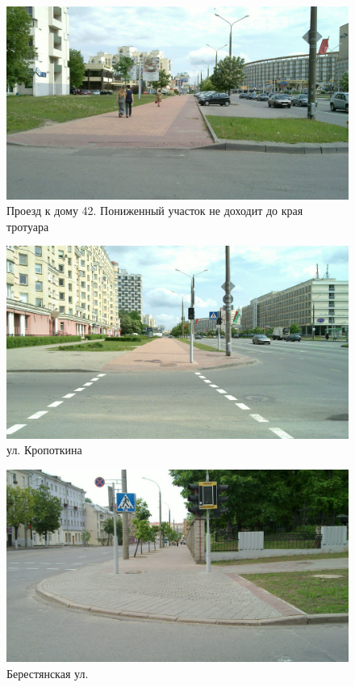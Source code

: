\documentclass[a4paper,14pt,twoside]{extarticle}
\begin{document}
\begin{figure}[h!]
    \centering
    \includegraphics[width=\textwidth]{Pictures/1000000000000A00000005A0A8601281.jpg}
    \caption{Проезд к дому 42. Пониженный участок не доходит до края тротуара}
\end{figure}

\begin{figure}[h!]
    \centering
    \includegraphics[width=\textwidth]{Pictures/1000000000000A00000005A0993F6107.jpg}
    \caption{ул. Кропоткина}
\end{figure}

\begin{figure}[h!]
    \centering
    \includegraphics[width=\textwidth]{Pictures/1000000000000A00000005A0A1C3E05B.jpg}
    \caption{Берестянская ул.}
\end{figure}
\end{document}
